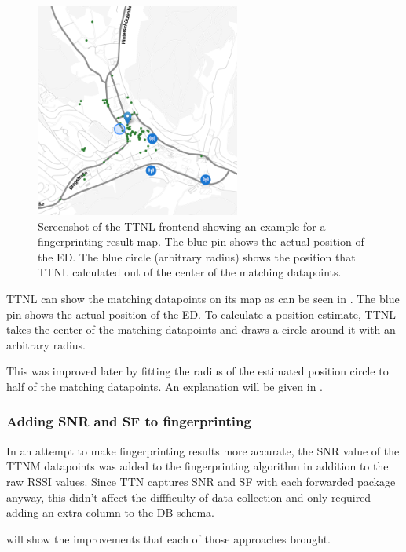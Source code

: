 \begin{figure}[htbp]
    \centering
    \includegraphics[width=0.6\textwidth]{pictures/ttn-locator/frontend/fingerprinting/rssi_similarity_map_example.png}
    \caption[Screenshot of the \acl{TTNL} frontend showing an example for a fingerprinting result map]{
        Screenshot of the \ac{TTNL} frontend showing an example for a fingerprinting result map.
        The blue pin shows the actual position of the \acl{ED}.
        The blue circle (arbitrary radius) shows the position that \ac{TTNL} calculated out of the center of the matching datapoints.
    }\label{fig:fingerprinting-map-example-only-center}
\end{figure}

\ac{TTNL} can show the matching datapoints on its map as can be seen in .
The blue pin shows the actual position of the \acl{ED}.
To calculate a position estimate, \ac{TTNL} takes the center of the matching datapoints and draws a circle around it with an arbitrary radius.

This was improved later by fitting the radius of the estimated position circle to half of the matching datapoints.
An explanation will be given in .

\subsubsection{Adding \acf{SNR} and \acf{SF} to fingerprinting}\label{sec:adding-snr-to-fingerprinting}

In an attempt to make fingerprinting results more accurate, the \ac{SNR} value of the \ac{TTNM} datapoints was added to the fingerprinting algorithm in addition to the raw \ac{RSSI} values.
Since \ac{TTN} captures \ac{SNR} and \ac{SF} with each forwarded package anyway, this didn't affect the diffficulty of data collection and only required adding an extra column to the \ac{DB} schema.

 will show the improvements that each of those approaches brought.